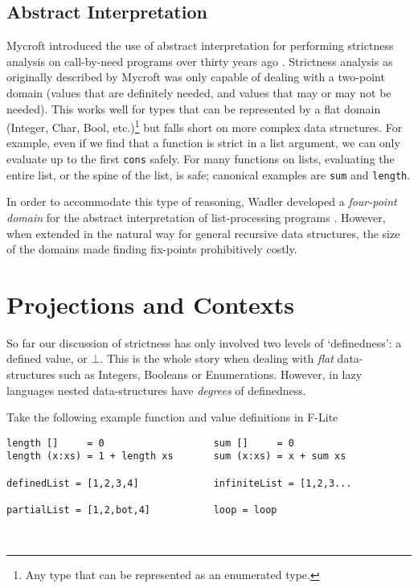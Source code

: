 \subsection{Abstract Interpretation}

Mycroft introduced the use of abstract interpretation for performing strictness
analysis on call-by-need programs over thirty years ago
\citep{mycroft1980theory}.
Strictness analysis as originally described by Mycroft was only capable of
dealing with a two-point domain (values that are definitely needed, and values
that may or may not be needed). This works well for types that can be
represented by a flat domain (Integer, Char, Bool, etc.)\footnote{Any type that
can be represented as an enumerated type.} but falls short on more complex data
structures. For example, even if we find that a function is strict in a list
argument, we can only evaluate up to the first \verb'cons' safely. For many
functions on lists, evaluating the entire list, or the spine of the list, is
safe; canonical examples are \verb'sum' and \verb'length'.

In order to accommodate this type of reasoning, Wadler developed a
\emph{four-point domain} for the abstract interpretation of list-processing
programs \citep{wadler1987strictness}. However, when extended in the natural way
for general recursive data structures, the size of the domains made finding
fix-points prohibitively costly.

\section{Projections and Contexts}
\label{sec:projections}

So far our discussion of strictness has only involved two levels of
`definedness': a defined value, or $\bot$. This is the whole story when dealing
with \emph{flat} data-structures such as Integers, Booleans or Enumerations.
However, in lazy languages nested data-structures have \emph{degrees} of
definedness.

Take the following example function and value definitions in F-Lite

\begin{centering}
\begin{BVerbatim}
length []     = 0                   sum []     = 0
length (x:xs) = 1 + length xs       sum (x:xs) = x + sum xs

definedList = [1,2,3,4]             infiniteList = [1,2,3...

partialList = [1,2,bot,4]           loop = loop
\end{BVerbatim}
\end{centering}\\

